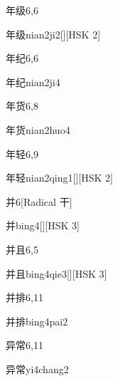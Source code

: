 \begin{entry}{年级}{6,6}
  \begin{phonetics}{年级}{nian2ji2}[][HSK 2]
  \end{phonetics}
\end{entry}

\begin{entry}{年纪}{6,6}
  \begin{phonetics}{年纪}{nian2ji4}
  \end{phonetics}
\end{entry}

\begin{entry}{年货}{6,8}
  \begin{phonetics}{年货}{nian2huo4}
  \end{phonetics}
\end{entry}

\begin{entry}{年轻}{6,9}
  \begin{phonetics}{年轻}{nian2qing1}[][HSK 2]
  \end{phonetics}
\end{entry}

\begin{entry}{并}{6}[Radical 干]
  \begin{phonetics}{并}{bing4}[][HSK 3]
  \end{phonetics}
\end{entry}

\begin{entry}{并且}{6,5}
  \begin{phonetics}{并且}{bing4qie3}[][HSK 3]
  \end{phonetics}
\end{entry}

\begin{entry}{并排}{6,11}
  \begin{phonetics}{并排}{bing4pai2}
  \end{phonetics}
\end{entry}

\begin{entry}{异常}{6,11}
  \begin{phonetics}{异常}{yi4chang2}
  \end{phonetics}
\end{entry}

